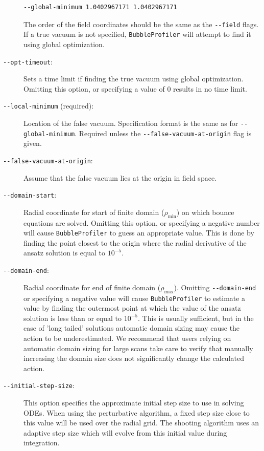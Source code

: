 \documentclass[final,3p,11pt,pdflatex]{elsarticle}
\makeatletter
\newcommand{\bp}{\texttt{BubbleProfiler}\@\xspace}
\newcommand{\code}[1]{\ifmmode\text{\nolinkurl{#1}}\else\nolinkurl{#1}\fi}
\newcommand{\rhomin}{\ensuremath{\rho_{\text{min}}}}
\newcommand{\rhomax}{\ensuremath{\rho_{\text{max}}}}
\makeatother
\begin{document}
\begin{description}
\begin{lstlisting}
--global-minimum 1.0402967171 1.0402967171
\end{lstlisting}

The order of the field coordinates should be the same as the \code{--field}
flags. If a true vacuum is not specified, \bp will attempt to find it using
global optimization.

\item[\texttt{-\/-opt-timeout}:] Sets a time limit if finding the true vacuum
  using global optimization. Omitting this option, or specifying a value of
  $0$ results in no time limit.

\item[\texttt{-\/-local-minimum} (required):] Location of the false vacuum.
  Specification format is the same as for \code{--global-minimum}. Required
  unless the \texttt{-\/-false-vacuum-at-origin} flag is given.

\item[\texttt{-\/-false-vacuum-at-origin}:] Assume that the false vacuum lies
  at the origin in field space.

\item[\texttt{-\/-domain-start}:] Radial coordinate for start of finite domain
  ($\rhomin$) on which bounce equations are solved. Omitting this option, or
  specifying a negative number will cause \bp to guess an
  appropriate value. This is done by finding the point closest to the origin
  where the radial derivative of the ansatz solution is equal to $10^{-5}$.

\item[\texttt{-\/-domain-end}:] Radial coordinate for end of finite domain
  ($\rhomax$). Omitting \texttt{-\/-domain-end} or specifying a negative value
  will cause \bp to estimate a value by finding the outermost point
  at which the value of the ansatz solution is less than or equal to $10^{-5}$.
  This is usually sufficient, but in the case of 'long tailed' solutions
  automatic domain sizing may cause the action to be underestimated.  We
  recommend that users relying on automatic domain sizing for large scans
  take care to verify that manually increasing the domain size does not
  significantly change the calculated action.

\item[\texttt{-\/-initial-step-size}:] This option specifies the approximate initial step size to use in solving ODEs. When using the perturbative algorithm, a fixed step size close to this value will be used over the radial grid. The shooting algorithm uses an adaptive step size which will evolve from this initial value during integration.


\end{description}
\end{document}
